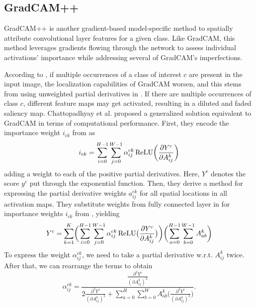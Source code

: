 \subsection{GradCAM++}\label{sub:gradcampp}

GradCAM++ \cite{grad-cam-pp} is another gradient-based model-specific method to spatially attribute convolutional layer features for a given class.
Like GradCAM, this method leverages gradients flowing through the network to assess individual activations' importance while addressing several of GradCAM's imperfections.

According to \cite{grad-cam-pp}, if multiple occurrences of a class of interest $c$ are present in the input image, the localization capabilities of GradCAM worsen, and this stems from using unweighted partial derivatives in .
If there are multiple occurrences of class $c$, different feature maps may get activated, resulting in a diluted and faded saliency map.
Chattopadhyay et al. \cite{grad-cam-pp} proposed a generalized solution equivalent to GradCAM in terms of computational performance.
First, they encode the importance weight $i_{ck}$ from  as
\begin{equation}\label{eq:grad-cam-pp-weights}
    i_{ck} = \sum_{i=0}^{H-1} \sum_{j=0}^{W-1} \alpha^{ck}_{ij} \operatorname{ReLU}\biggl(\frac{\partial Y^c}{\partial A^k_{ij}}\biggr)
\end{equation}
adding a weight to each of the positive partial derivatives.
Here, $Y^c$ denotes the score $y^c$ put through the exponential function. Then, they derive a method for expressing the partial derivative weights $a^{ck}_{ij}$ for all spatial locations in all activation maps.
They substitute weights from fully connected layer in  for importance weights $i_{ck}$ from , yielding
\begin{equation}\label{eq:grad-cam-pp-score}
    Y^c = \sum_{k=1}^K \biggl( \sum_{i=0}^{H-1} \sum_{j=0}^{W-1} \alpha^{ck}_{ij} \operatorname{ReLU} \bigl(\frac{\partial Y^c}{\partial A^k_{ij}}\bigr) \biggr) \biggl( \sum_{a=0}^{H-1} \sum_{b=0}^{W-1} A^{k}_{ab} \biggr)
\end{equation}
To express the weight $\alpha^{ck}_{ij}$, we need to take a partial derivative w.r.t. $A^k_{ij}$ twice. After that, we can rearrange the terms to obtain
\begin{equation}
    \alpha^{ck}_{ij} = \frac{\frac{\partial^2 Y^c}{(\partial A^k_{ij})^2}}{2\frac{\partial^2 Y^c}{(\partial A^k_{ij})^2} + \sum_{a=0}^H \sum_{b=0}^W A^{k}_{ab} \bigl( \frac{\partial^3 Y^c}{(\partial A^k_{ij})^3} \bigr)}.
\end{equation}

